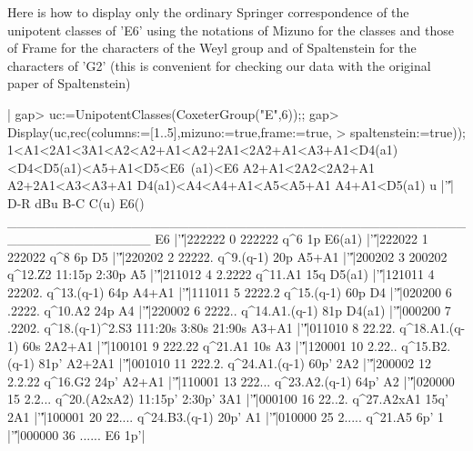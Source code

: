 Here  is how  to display  only the  ordinary Springer correspondence of the
unipotent classes of 'E6' using the notations of Mizuno for the classes and
those of Frame for the characters of the Weyl group and of Spaltenstein for
the  characters of 'G2' (this is convenient  for checking our data with the
original paper of Spaltenstein)\:

|    gap> uc:=UnipotentClasses(CoxeterGroup("E",6));;
    gap> Display(uc,rec(columns:=[1..5],mizuno:=true,frame:=true,
    > spaltenstein:=true));
    1<A1<2A1<3A1<A2<A2+A1<A2+2A1<2A2+A1<A3+A1<D4(a1)<D4<D5(a1)<A5+A1<D5<E6\
    (a1)<E6
    A2+A1<2A2<2A2+A1
    A2+2A1<A3<A3+A1
    D4(a1)<A4<A4+A1<A5<A5+A1
    A4+A1<D5(a1)
         u |'\|'|   D-R dBu    B-C               C(u)                 E6()
    _______________________________________________________________
    E6     |'\|'|222222   0 222222                q^6                   1p
    E6(a1) |'\|'|222022   1 222022                q^8                   6p
    D5     |'\|'|220202   2 22222.          q^9.(q-1)                  20p
    A5+A1  |'\|'|200202   3 200202            q^12.Z2         11:15p 2:30p
    A5     |'\|'|211012   4 2.2222            q^11.A1                  15q
    D5(a1) |'\|'|121011   4 22202.         q^13.(q-1)                  64p
    A4+A1  |'\|'|111011   5 2222.2         q^15.(q-1)                  60p
    D4     |'\|'|020200   6 .2222.            q^10.A2                  24p
    A4     |'\|'|220002   6 2222..      q^14.A1.(q-1)                  81p
    D4(a1) |'\|'|000200   7 .2202.    q^18.(q-1)^2.S3 111:20s 3:80s 21:90s
    A3+A1  |'\|'|011010   8 22.22.      q^18.A1.(q-1)                  60s
    2A2+A1 |'\|'|100101   9 222.22            q^21.A1                  10s
    A3     |'\|'|120001  10 2.22..      q^15.B2.(q-1)                 81p'
    A2+2A1 |'\|'|001010  11 222.2.      q^24.A1.(q-1)                 60p'
    2A2    |'\|'|200002  12 2.2.22            q^16.G2                 24p'
    A2+A1  |'\|'|110001  13 222...      q^23.A2.(q-1)                 64p'
    A2     |'\|'|020000  15 2.2...       q^20.(A2xA2)       11:15p' 2:30p'
    3A1    |'\|'|000100  16 22..2.         q^27.A2xA1                 15q'
    2A1    |'\|'|100001  20 22....      q^24.B3.(q-1)                 20p'
    A1     |'\|'|010000  25 2.....            q^21.A5                  6p'
    1      |'\|'|000000  36 ......                 E6                  1p'|

\Section{ICCTable}

